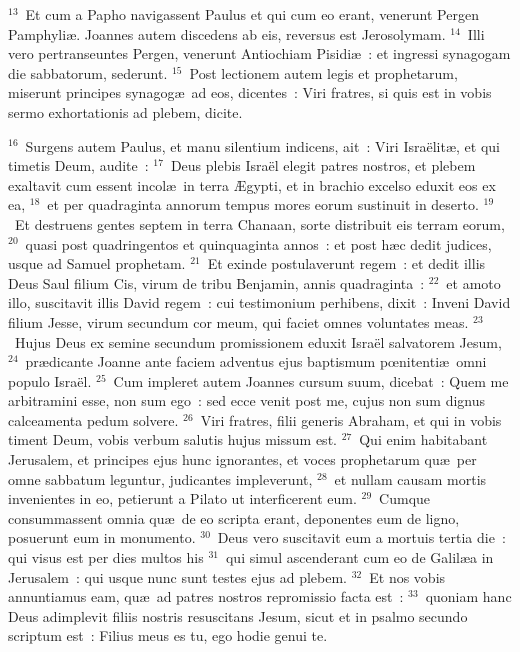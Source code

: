 ${}^{13}$~Et cum a Papho navigassent Paulus et qui cum eo erant, venerunt Pergen Pamphyli\ae . Joannes autem discedens ab eis, reversus est Jerosolymam.
${}^{14}$~Illi vero pertranseuntes Pergen, venerunt Antiochiam Pisidi\ae~: et ingressi synagogam die sabbatorum, sederunt.
${}^{15}$~Post lectionem autem legis et prophetarum, miserunt principes synagog\ae\ ad eos, dicentes~: Viri fratres, si quis est in vobis sermo exhortationis ad plebem, dicite.


${}^{16}$~Surgens autem Paulus, et manu silentium indicens, ait~: Viri Isra\"elit\ae , et qui timetis Deum, audite~:
${}^{17}$~Deus plebis Isra\"el elegit patres nostros, et plebem exaltavit cum essent incol\ae\ in terra \AE gypti, et in brachio excelso eduxit eos ex ea,
${}^{18}$~et per quadraginta annorum tempus mores eorum sustinuit in deserto.
${}^{19}$~Et destruens gentes septem in terra Chanaan, sorte distribuit eis terram eorum,
${}^{20}$~quasi post quadringentos et quinquaginta annos~: et post h\ae c dedit judices, usque ad Samuel prophetam.
${}^{21}$~Et exinde postulaverunt regem~: et dedit illis Deus Saul filium Cis, virum de tribu Benjamin, annis quadraginta~:
${}^{22}$~et amoto illo, suscitavit illis David regem~: cui testimonium perhibens, dixit~: Inveni David filium Jesse, virum secundum cor meum, qui faciet omnes voluntates meas.
${}^{23}$~Hujus Deus ex semine secundum promissionem eduxit Isra\"el salvatorem Jesum,
${}^{24}$~pr\ae dicante Joanne ante faciem adventus ejus baptismum pœnitenti\ae\ omni populo Isra\"el.
${}^{25}$~Cum impleret autem Joannes cursum suum, dicebat~: Quem me arbitramini esse, non sum ego~: sed ecce venit post me, cujus non sum dignus calceamenta pedum solvere.
${}^{26}$~Viri fratres, filii generis Abraham, et qui in vobis timent Deum, vobis verbum salutis hujus missum est.
${}^{27}$~Qui enim habitabant Jerusalem, et principes ejus hunc ignorantes, et voces prophetarum qu\ae\ per omne sabbatum leguntur, judicantes impleverunt,
${}^{28}$~et nullam causam mortis invenientes in eo, petierunt a Pilato ut interficerent eum.
${}^{29}$~Cumque consummassent omnia qu\ae\ de eo scripta erant, deponentes eum de ligno, posuerunt eum in monumento.
${}^{30}$~Deus vero suscitavit eum a mortuis tertia die~: qui visus est per dies multos his
${}^{31}$~qui simul ascenderant cum eo de Galil\ae a in Jerusalem~: qui usque nunc sunt testes ejus ad plebem.
${}^{32}$~Et nos vobis annuntiamus eam, qu\ae\ ad patres nostros repromissio facta est~:
${}^{33}$~quoniam hanc Deus adimplevit filiis nostris resuscitans Jesum, sicut et in psalmo secundo scriptum est~: Filius meus es tu, ego hodie genui te.

